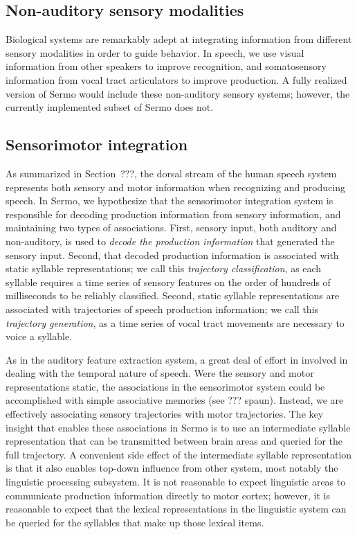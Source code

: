 \subsection{Non-auditory sensory modalities}

Biological systems are remarkably adept
at integrating information
from different sensory modalities
in order to guide behavior.
In speech,
we use visual information
from other speakers to improve recognition,
and somatosensory information
from vocal tract articulators
to improve production.
A fully realized version of Sermo
would include these non-auditory sensory systems;
however, the currently implemented
subset of Sermo does not.

\subsection{Sensorimotor integration}

As summarized in Section~???,
the dorsal stream of the human speech system
represents both sensory and motor information
when recognizing and producing speech.
In Sermo,
we hypothesize that
the sensorimotor integration system
is responsible for decoding production information
from sensory information,
and maintaining two types of associations.
First, sensory input,
both auditory and non-auditory,
is used to \textit{decode the production information}
that generated the sensory input.
Second, that decoded production information
is associated with
static syllable representations;
we call this \textit{trajectory classification},
as each syllable requires
a time series of sensory features
on the order of hundreds of milliseconds
to be reliably classified.
Second, static syllable representations
are associated with
trajectories of speech production information;
we call this \textit{trajectory generation},
as a time series of vocal tract movements
are necessary to voice a syllable.

As in the auditory feature extraction system,
a great deal of effort in involved in
dealing with the temporal nature of speech.
Were the sensory and motor representations static,
the associations in the sensorimotor system
could be accomplished
with simple associative memories
(see ??? spaun).
Instead, we are effectively associating
sensory trajectories with motor trajectories.
The key insight
that enables these associations in Sermo
is to use an intermediate syllable representation
that can be transmitted between
brain areas and queried
for the full trajectory.
A convenient side effect of
the intermediate syllable representation
is that it also enables
top-down influence from
other system,
most notably the linguistic processing subsystem.
It is not reasonable to expect
linguistic areas to communicate
production information directly
to motor cortex;
however, it is reasonable to expect
that the lexical representations
in the linguistic system
can be queried for the syllables
that make up those lexical items.


